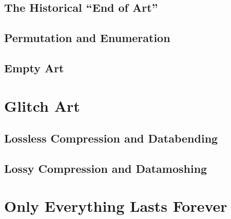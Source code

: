 \documentclass{thesis}
\begin{document}
\section{The Historical ``End of Art''}
	\cite{Wright09}\cite{moma_kazimir_2006}\cite{moma_rodchenko_1998}
\section{Permutation and Enumeration}
	\cite{boolos_computability_2002}\cite{borges_aleph_2004}\cite{borges_library_2000}
	\cite{christian_scheib_statics_????}\cite{jim_campbell_end_1996}\cite{john_f._simon_jr._every_????}
	\cite{john_f._simon_jr._given:32_1997}\cite{kyle_mcdonald_nandhopper_2008}\cite{kyle_mcdonald_pppd_2009}
	\cite{leander_seige_imagen_????}\cite{leonardo_solaas_magic_????}\cite{matthew_mirapaul_in_1997}
	\cite{michael_aschauer_8-bit_????}\cite{nattiez_music_1990}\cite{remko_scha_every_2001}\cite{sintron_gods_2003}
	\cite{tomczak_all_2009}\cite{tomczak_hardware-based_2009}\cite{alexander_christiaan_jacob_allrgb_2008}
	\cite{allan_mccollum_shapes_2006}\cite{jem_finer_longplayer_????}\cite{john_cage_as_????}\cite{paul_slocum_pi_2007}
	\cite{brian_whitman_eigenradio_2005}\cite{keith_f._lynch_converting_????}
\section{Empty Art}
	\cite{larry_j_solomon_sounds_1998}
	
\chapter{Glitch Art}
\section{Lossless Compression and Databending}
	\cite{indianropeburn_databenders_????}\cite{liminalmike_flickr:glitch_????}\cite{cory_arcangel_photoshop_2009}
	\cite{media_art_net_media_2010}
\section{Lossy Compression and Datamoshing}
	\cite{!mediengruppe_bitnik_and_sven_knig_download_????}\cite{evan_meaney_ceibas:_2008}\cite{imbecil_mpeg_2004}
	\cite{john_michael_boling_rhizome_????}\cite{nikolai_trunichkin_and_dr._dmitriy_vatolin_crazy_????}
	\cite{ramachandran_phantoms_1999}
	
\chapter{Only Everything Lasts Forever}
\end{document}

